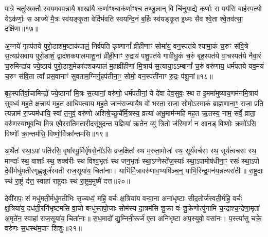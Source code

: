 पात्रे॒ चतुः॑स्रक्तौ स्वयमवप॒न्नायै॒ शाखा॑यै क॒र्णाꣳश्चाक॑र्णाꣳश्च तण्डु॒लान् वि चि॑नुया॒द्ये क॒र्णाः स पय॑सि बार्\mbox{}हस्प॒त्यो ये\-ऽक॑र्णाः॒ स आज्ये॑ मै॒त्रः स्व॑यङ्कृ॒ता वेदि॑र्भवति स्वयन्दि॒नं ब॒र्\mbox{}हिः स्व॑यङ्कृ॒त इ॒ध्मः सैव श्वे॒ता श्वे॒तव॑त्सा॒ दक्षि॑णा॥१७॥


{}

अ॒ग्नये॑ गृ॒हप॑तये पुरो॒डाश॑म॒ष्टाक॑पालं॒ निर्व॑पति कृ॒ष्णानां᳚ व्रीही॒णाꣳ सोमा॑य॒ वन॒स्पत॑ये श्यामा॒कं च॒रुꣳ स॑वि॒त्रे स॒त्यप्र॑सवाय पुरो॒डाशं॒ द्वाद॑शकपालमाशू॒नां व्री॑ही॒णाꣳ रु॒द्राय॑ पशु॒पत॑ये गावीधु॒कं च॒रुं बृह॒स्पत॑ये वा॒चस्पत॑ये नैवा॒रं च॒रुमिन्द्रा॑य ज्ये॒ष्ठाय॑ पुरो॒डाश॒मेका॑दशकपालं म॒हाव्री॑हीणां मि॒त्राय॑ स॒त्याया॒\-ऽ\-ऽम्बानां᳚ च॒रुं वरु॑णाय॒ धर्म॑पतये यव॒मयं॑ च॒रुꣳ स॑वि॒ता त्वा᳚ प्रस॒वानाꣳ॑ सुवताम॒ग्निर्गृ॒हप॑तीना॒ꣳ॒ सोमो॒ वन॒स्पती॑नाꣳ रु॒द्रः प॑शू॒नां॥१८॥

बृह॒स्पति॑र्वा॒चामिन्द्रो᳚ ज्ये॒ष्ठानां᳚ मि॒त्रः स॒त्यानां॒ वरु॑णो॒ धर्म॑पतीनां॒ ये दे॑वा देव॒सुवः॒ स्थ त इ॒ममा॑मुष्याय॒णम॑\-नमि॒त्राय॑ सुवध्वं मह॒ते क्ष॒त्त्राय॑ मह॒त आधि॑पत्याय मह॒ते जान॑राज्यायै॒ष वो॑ भरता॒ राजा॒ सोमो॒\-ऽस्माकं॑ ब्राह्म॒णाना॒ꣳ॒ राजा॒ प्रति॒ त्यन्नाम॑ रा॒ज्यम॑धायि॒ स्वां त॒नुवं॒ वरु॑णो अशिश्रे॒च्छुचे᳚र्मि॒त्रस्य॒ व्रत्या॑ अभू॒माम॑न्महि मह॒त ऋ॒तस्य॒ नाम॒ सर्वे॒ व्राता॒ वरु॑णस्याभूव॒न्वि मि॒त्र एवै॒ररा॑तिमतारी॒दसू॑षुदन्त य॒ज्ञिया॑ ऋ॒तेन॒ व्यु॑ त्रि॒तो ज॑रि॒माणं॑ न आन॒ड् विष्णोः॒ क्रमो॑\-ऽसि॒ विष्णोः᳚ क्रा॒न्तम॑सि॒ विष्णो॒र्विक्रा᳚न्तमसि॥१९॥

{\anuvakamend[{प॒शू॒नां व्राताः॒ पञ्च॑विꣳशतिश्च॥10॥}]}

अ॒र्थेतः॑ स्था॒\-ऽपां पति॑रसि॒ वृषा᳚स्यू॒र्मिर्वृ॑षसे॒नो॑\-ऽसि व्रज॒क्षितः॑ स्थ म॒रुता॒मोजः॑ स्थ॒ सूर्य॑वर्चसः स्थ॒ सूर्य॑त्वचसः स्थ॒ मान्दाः᳚ स्थ॒ वाशाः᳚ स्थ॒ शक्व॑रीः स्थ विश्व॒भृतः॑ स्थ जन॒भृतः॑ स्था॒\-ऽग्नेस्ते॑ज॒स्याः᳚ स्था॒\-ऽपामोष॑धीना॒ꣳ॒ रसः॑ स्था॒\-ऽपो दे॒वीर्मधु॑मतीरगृह्ण॒न्नूर्ज॑स्वती राज॒सूया॑य॒ चिता॑नाः। याभि॑र्मि॒त्रावरु॑णाव॒भ्यषि॑ञ्च॒न्॒ याभि॒रिन्द्र॒मन॑य॒न्नत्यरा॑तीः॥ रा॒ष्ट्र॒दाः स्थ॑ रा॒ष्ट्रं द॑त्त॒ स्वाहा॑ राष्ट्र॒दाः स्थ॑ रा॒ष्ट्रम॒मुष्मै॑ दत्त॥२०॥

{\anuvakamend[{अत्येका॑दश च॥11॥}]}

देवी॑रापः॒ सं मधु॑मती॒र्मधु॑मतीभिः सृज्यध्वं॒ महि॒ वर्चः॑ क्ष॒त्रिया॑य वन्वा॒ना अना॑धृष्टाः सीद॒तोर्ज॑स्वती॒र्महि॒ वर्चः॑ क्ष॒त्रिया॑य॒ दध॑ती॒रनि॑भृष्टमसि वा॒चो बन्धु॑स्तपो॒जाः सोम॑स्य दा॒त्रम॑सि शु॒क्रा वः॑ शु॒क्रेणोत्पु॑नामि च॒न्द्राश्च॒न्द्रेणा॒मृता॑ अ॒मृते॑न॒ स्वाहा॑ राज॒सूया॑य॒ चिता॑नाः॥ स॒ध॒मादो᳚ द्यु॒म्निनी॒रूर्ज॑ ए॒ता अनि॑भृष्टा अप॒स्युवो॒ वसा॑नः। प॒स्त्या॑सु चक्रे॒ वरु॑णः स॒धस्थ॑म॒पाꣳ शिशुः॑॥२१॥


